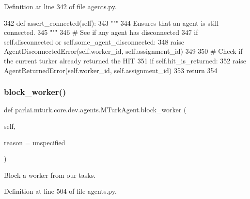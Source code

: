 Definition at line 342 of file agents.\+py.


\begin{DoxyCode}
342     \textcolor{keyword}{def }assert\_connected(self):
343         \textcolor{stringliteral}{"""}
344 \textcolor{stringliteral}{        Ensures that an agent is still connected.}
345 \textcolor{stringliteral}{        """}
346         \textcolor{comment}{# See if any agent has disconnected}
347         \textcolor{keywordflow}{if} self.disconnected \textcolor{keywordflow}{or} self.some\_agent\_disconnected:
348             \textcolor{keywordflow}{raise} AgentDisconnectedError(self.worker\_id, self.assignment\_id)
349 
350         \textcolor{comment}{# Check if the current turker already returned the HIT}
351         \textcolor{keywordflow}{if} self.hit\_is\_returned:
352             \textcolor{keywordflow}{raise} AgentReturnedError(self.worker\_id, self.assignment\_id)
353         \textcolor{keywordflow}{return}
354 
\end{DoxyCode}
\mbox{\label{classparlai_1_1mturk_1_1core_1_1dev_1_1agents_1_1MTurkAgent_a9c489d23ae16a931ef3945752e9fe359}} 
\subsubsection{\texorpdfstring{block\+\_\+worker()}{block\_worker()}}
{\footnotesize\ttfamily def parlai.\+mturk.\+core.\+dev.\+agents.\+M\+Turk\+Agent.\+block\+\_\+worker (\begin{DoxyParamCaption}\item[{}]{self,  }\item[{}]{reason = {\ttfamily \textquotesingle{}unspecified\textquotesingle{}} }\end{DoxyParamCaption})}

\begin{DoxyVerb}Block a worker from our tasks.
\end{DoxyVerb}
 

Definition at line 504 of file agents.\+py.


